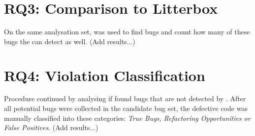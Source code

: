 \section{RQ3: Comparison to Litterbox}\label{sec:litterbox}
On the same analysation set, \litterbox{} was used to find bugs and count how many of these bugs the \ngram{} can detect as well. (Add results...)
 
\section{RQ4: Violation Classification}\label{sec:violations}
Procedure  continued by analysing if \ngram{} found bugs that are not detected by \litterbox{}. After all potential bugs were collected in the candidate bug set, the defective code was manually classified into these categories: \textit{True Bugs, Refactoring Opportunities or False Positives}. (Add results...)


